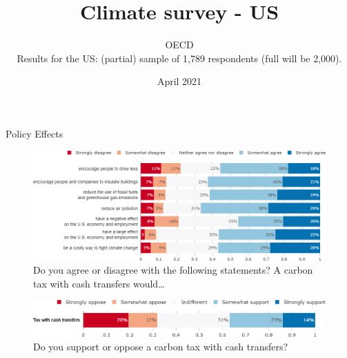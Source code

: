 \documentclass[aspectratio=169,9pt,dvipsnames]{beamer}
\title[Climate survey - US]{\huge Climate survey - US}
\author[OECD]{OECD \\ \vspace{1cm}
     Results for the US: (partial) sample of 1,789 respondents (full will be 2,000).}%
\date[\insertsection]{April 2021}
\begin{document}
	\begin{frame}

\titlepage

	\end{frame}


\begin{frame}{Policy Effects}%
\vspace{-0.2cm}
\begin{figure}[h!]
\centering
\caption{Do you agree or disagree with the following statements? A carbon tax with cash transfers would…}
\includegraphics[width=.9\textwidth]{../figures/US/tax_transfers_effect_US.png}
\end{figure}
\vspace{-0.2cm}
\begin{figure}[h!]


\centering
\caption{Do you support or oppose a carbon tax with cash transfers?}
\includegraphics[width=.9\textwidth]{../figures/US/tax_transfers_support_US.png}
\end{figure}
\end{frame}
\end{document}

